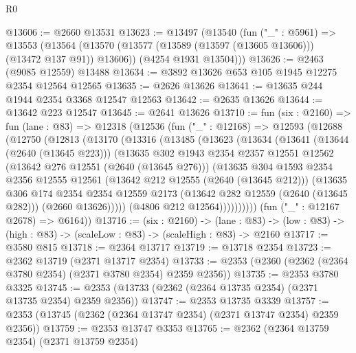 \begin{lexlean}{R0}
\begin{coremodule}
@13606 := @2660 @13531
@13623 := @13497
    (@13540
      (fun ("_" : @5961) =>
      @13553
        (@13564 (@13570 (@13577 (@13589 (@13597 (@13605 @13606))) (@13472 @137 @91)) @13606))
        (@4254 @1931 @13504)))
@13626 := @2463 (@9085 @12559) @13488
@13634 := @3892 @13626 @653 @105 @1945 @12275 @2354 @12564 @12565
@13635 := @2626 @13626
@13641 := @13635 @244 @1944 @2354 @3368 @12547 @12563
@13642 := @2635 @13626
@13644 := @13642 @223 @12547
@13645 := @2641 @13626
@13710 := fun (six : @2160) =>
  fun (lane : @83) =>
  @12318
    (@12536
      (fun ("_" : @12168) =>
      @12593
        (@12688
          (@12750
            (@12813
              (@13170
                (@13316
                  (@13485
                    (@13623
                      (@13634
                        (@13641
                          (@13644 (@2640 (@13645 @223)))
                          (@13635
                            @302
                            @1943
                            @2354
                            @2357
                            @12551
                            @12562
                            (@13642 @276 @12551 (@2640 (@13645 @276)))
                            (@13635
                              @304
                              @1593
                              @2354
                              @2356
                              @12555
                              @12561
                              (@13642 @212 @12555 (@2640 (@13645 @212)))
                              (@13635
                                @306
                                @174
                                @2354
                                @2354
                                @12559
                                @2173
                                (@13642 @282 @12559 (@2640 (@13645 @282)))
                                (@2660 @13626)))))
                        (@4806 @212 @12564))))))))))
      (fun ("_" : @12167 @2678) => @6164))
@13716 := (six : @2160) ->
  (lane : @83) -> (low : @83) -> (high : @83) -> (scaleLow : @83) -> (scaleHigh : @83) -> @2160
@13717 := @3580 @815
@13718 := @2364 @13717
@13719 := @13718 @2354
@13723 := @2362 @13719 (@2371 @13717 @2354)
@13733 := @2353 (@2360 (@2362 (@2364 @3780 @2354) (@2371 @3780 @2354) @2359 @2356))
@13735 := @2353 @3780 @3325
@13745 := @2353 (@13733 (@2362 (@2364 @13735 @2354) (@2371 @13735 @2354) @2359 @2356))
@13747 := @2353 @13735 @3339
@13757 := @2353 (@13745 (@2362 (@2364 @13747 @2354) (@2371 @13747 @2354) @2359 @2356))
@13759 := @2353 @13747 @3353
@13765 := @2362 (@2364 @13759 @2354) (@2371 @13759 @2354)

\end{coremodule}
\end{lexlean}
